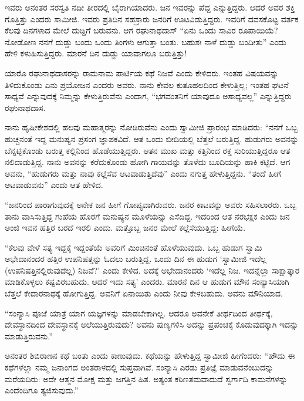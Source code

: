  ಇವರು ಅನಂತರ ಸರಸ್ವತಿ ನದೀ ತೀರದಲ್ಲಿ ಬೈರಾಗಿಯಾದರು. ಜನ ಇವರನ್ನು ಪೆದ್ದ ಎನ್ನುತ್ತಿದ್ದರು. ಆದರೆ ಅವರ ಶಕ್ತಿ ಗೊತ್ತಿತ್ತು ಎಂದರು ಸಾಮೀಜಿ. ಇವರು ಪ್ರತಿದಿನ ಸಹಸ್ರಾರು ಜನರಿಗೆ ಊಟವಿಡುತ್ತಿದ್ದರು. ಇವರಿಗೆ ದವಸಕೊಟ್ಟ ವರ್ತಕ ಕೆಲವು ದಿನಗಳಾದ ಮೇಲೆ ದುಡ್ಡಿಗೆ ಬರುವನು. ಆಗ ರಘುನಾಥದಾಸ್ “ಏನು ಒಂದು ಸಾವಿರ ರೂಪಾಯಿಯೆ? ನೋಡೋಣ ನನಗೆ ದುಡ್ಡು ಬಂದು ಒಂದು ತಿಂಗಳು ಆಗುತ್ತಾ ಬಂತು. ಬಹುಶಃ ನಾಳೆ ದುಡ್ಡು ಬಂದೀತು” ಎಂದು ಹೇಳಿ ಕಳುಹಿಸುತ್ತಿದ್ದರು. ಮಾರನೆ ದಿನ ದುಡ್ಡು ಯಾವಾಗಲೂ ಬರುತ್ತಿತ್ತು! 

 ಯಾರೊ ರಘುನಾಥದಾಸರನ್ನು ರಾಮನಾಮ ಪಾರ್ಟಿಯ ಕಥೆ ನಿಜವೆ ಎಂದು ಕೇಳಿದರು. ಇಂತಹ ವಿಷಯವನ್ನು ತಿಳಿದುಕೊಂಡು ಏನು ಪ್ರಯೋಜನ ಎಂದರು ಅವರು. ನಾನು ಕೇವಲ ಕುತೂಹಲದಿಂದ ಕೇಳುತ್ತಿಲ್ಲ; ಇಂತಹ ಘಟನೆ ಸಾಧ್ಯವೆ ಎನ್ನುವುದಕ್ಕೆ ನಿಮ್ಮನ್ನು ಕೇಳುತ್ತಿರುವೆನು ಎಂದಾಗ, “ಭಗವಂತನಿಗೆ ಯಾವುದೂ ಅಸಾಧ್ಯವಲ್ಲ” ಎನ್ನುತ್ತಿದ್ದರು ರಘುನಾಥದಾಸ. 

 ನಾನು ಹೃಷೀಕೇಶದಲ್ಲಿ ಹಲವು ಮಹಾತ್ಮರನ್ನು ನೋಡಿರುವೆನು ಎಂದು ಸ್ವಾಮೀಜಿ ಪ್ರಾರಂಭ ಮಾಡಿದರು: “ನನಗೆ ಒಬ್ಬ ಹುಚ್ಚನಂತೆ ಇದ್ದ ಮನುಷ್ಯನ ಪ್ರಸಂಗ ಜ್ಞಾಪಕವಿದೆ. ಆತ ಒಂದು ಬೀದಿಯಲ್ಲಿ ಬೆತ್ತಲೆ ಬರುತ್ತಿದ್ದ. ಹುಡುಗರು ಅವನನ್ನು ಬೆನ್ನಟ್ಟಿಕೊಂಡು ಬರುತ್ತ ಕಲ್ಲಿನಿಂದ ಹೊಡೆಯುತ್ತಿದ್ದರು. ಆತನ ಮುಖ ಮತ್ತು ಕತ್ತಿನಿಂದ ರಕ್ತ ಸುರಿಯುತ್ತಿದ್ದರೂ ಆತ ನಲಿದಾಡುತ್ತಿದ್ದ. ನಾನು ಅವನನ್ನು ಕರೆದುಕೊಂಡು ಹೋಗಿ ಗಾಯವನ್ನು ತೊಳೆದು ಬೂದಿಯನ್ನು ಹಾಕಿ ಕಟ್ಟಿದೆ. ಆಗ ಅವನು, “ಹುಡುಗರು ಮತ್ತು ನಾವು ಕಲ್ಲೆಸೆವ ಆಟವಾಡುತ್ತಿದೆವು” ಎಂದು ನಗುತ್ತ ಹೇಳುತ್ತಿದ್ದನು. “ತಂದೆ ಹೀಗೆ ಆಟವಾಡುವನು” ಎಂದು ಆತ ಹೇಳಿದ. 

 “ಜನರಿಂದ ಪಾರಾಗುವುದಕ್ಕೆ ಅನೇಕ ಜನ ಹೀಗೆ ಗೋಪ್ಯವಾಗಿರುವರು. ಜನರ ಕಾಟವನ್ನು ಅವರು ಸಹಿಸಲಾರರು. ಒಬ್ಬ ತಾನು ವಾಸಿಸುತ್ತಿದ್ದ ಗುಹೆಯ ಹೊರಗೆ ಮನುಷ್ಯನ ಮೂಳೆಯನ್ನು ಎಸೆದಿದ್ದ. ಇದರಿಂದ ಆತ ನರಭಕ್ಷಕ ಎಂದು ಜನ ಅಂಜಿ ಇವನ ಹತ್ತಿರ ಬರದೆ ಇರಲಿ ಎಂದು. ಮತ್ತೊಬ್ಬ ಜನರ ಮೇಲೆ ಕಲ್ಲೆಸೆಯುತ್ತಿದ್ದ: ಹೀಗೆಯೆ. 

 “ಕೆಲವು ವೇಳೆ ಸತ್ಯ ಇದ್ದಕ್ಕೆ ಇದ್ದಂತೆಯೆ ಅವರಿಗೆ ಮಿಂಚಿನಂತೆ ಹೊಳೆಯುವುದು. ಒಬ್ಬ ಹುಡುಗ ಸ್ವಾಮಿ ಅಭೇದಾನಂದರ ಹತ್ತಿರ ಉಪನಿಷತ್ತನ್ನು ಓದಲು ಬರುತ್ತಿದ್ದ. ಒಂದು ದಿನ ಈ ಹುಡುಗ ‘ಸ್ವಾಮೀಜಿ ಇದೆಲ್ಲ (ಉಪನಿಷತ್ತಿನಲ್ಲಿರುವುದೆಲ್ಲ) ನಿಜವೆ?’ ಎಂದು ಕೇಳಿದ. ಅದಕ್ಕೆ ಅಭೇದಾನಂದರು ‘ಇದೆಲ್ಲ ನಿಜ. ಇದನ್ನೆಲ್ಲಾ ಸಾಕ್ಷಾತ್ಕಾರ ಮಾಡಿಕೊಳ್ಳಲು ಕಷ್ಟವಿರಬಹುದು. ಆದರೆ ಇದು ಸತ್ಯ’ ಎಂದರು. ಮಾರನೆ ದಿನ ಆ ಹುಡುಗ ಮೌನ ಸಂನ್ಯಾಸಿಯಾಗಿ ಬೆತ್ತಲೆ ಕೇದಾರನಾಥಕ್ಕೆ ಹೋಗುತ್ತಿದ್ದ. ಅವನಿಗೆ ಏನಾಯಿತು ಎಂದು ನೀವು ಕೇಳಬಹುದು. ಅವನು ಮೌನಿಯಾದ. 

 “ಸಂನ್ಯಾಸಿ ಪೂಜೆ ಯಾತ್ರೆ ಯಾಗ ಯಜ್ಞಗಳನ್ನು ಮಾಡಬೇಕಾಗಿಲ್ಲ. ಆದರೂ ಅವನೇಕೆ ತೀರ್ಥದಿಂದ ತೀರ್ಥಕ್ಕೆ, ದೇವಸ್ಥಾನದಿಂದ ದೇವಸ್ಥಾನಕ್ಕೆ ಅಲೆಯುತ್ತಿರುವುದು? ಅವನು ಪುಣ್ಯಗಳಿಸಿ ಅದನ್ನು ಪ್ರಪಂಚಕ್ಕೆ ಕೊಡುವುದಕ್ಕಾಗಿ ಇದನ್ನು ಮಾಡುತ್ತಿರುವನು.” 

 ಅನಂತರ ಶಿಬಿರಾಣನ ಕಥೆ ಬಂತು ಎಂದು ಕಾಣುವುದು. ಕಥೆಯನ್ನು ಹೇಳುತ್ತಿದ್ದ ಸ್ವಾಮೀಜಿ ಹೀಗೆಂದರು: “ಹೌದು ಈ ಕಥೆಗಳೆಲ್ಲಾ ನಮ್ಮ ಜನಾಂಗದ ಅಂತರಾಳದಲ್ಲಿ ಸುಪ್ತವಾಗಿವೆ. ಸಂನ್ಯಾಸಿ ಎರಡು ಪ್ರತಿಜ್ಞೆ ಮಾಡುವನೆಂಬುದನ್ನು ಮರೆಯದಿರು: ಅದೇ ಆತ್ಮನ ಮೋಕ್ಷ ಮತ್ತು ಜಗತ್ತಿನ ಹಿತ. ಅತ್ಯಂತ ಕಠಿಣತಮವಾದುದೆ ಸ್ವರ್ಗಾದಿ ಕಾಮನೆಗಳನ್ನು ಎಂದೆಂದಿಗೂ ತ್ಯಜಿಸುವುದು.”



